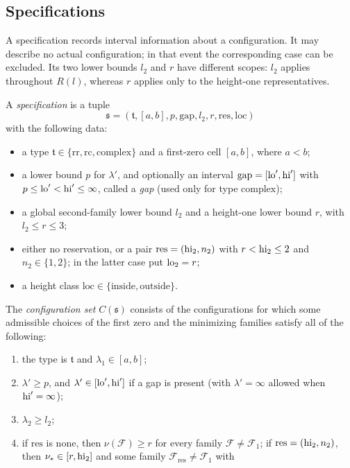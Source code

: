 \subsection{Specifications}\label{subsec:specifications}

A specification records interval information about a configuration. It may describe
no actual configuration; in that event the corresponding case can be excluded.
Its two lower bounds $l_2$ and $r$ have different scopes: $l_2$ applies throughout
$R(l)$, whereas $r$ applies only to the height-one representatives.

\begin{definition}[Specification]\label{def:specification}
A \emph{specification} is a tuple
\[
  \mathfrak s=(\mathfrak t,[a,b],p,\mathrm{gap},l_2,r,\mathrm{res},\mathrm{loc})
\]
with the following data:
\begin{itemize}
  \item a type $\mathfrak t\in\{\mathrm{rr},\mathrm{rc},\mathrm{complex}\}$ and a
    first-zero cell $[a,b]$, where $a<b$;
  \item a lower bound $p$ for $\lambda'$, and optionally an interval
    $\mathrm{gap}=[\mathrm{lo}',\mathrm{hi}']$ with $p\le\mathrm{lo}'<\mathrm{hi}'\le\infty$, called a \emph{gap}
    (used only for type $\mathrm{complex}$);
  \item a global second-family lower bound $l_2$ and a height-one lower bound $r$,
    with $l_2\le r\le3$;
  \item either no reservation, or a pair $\mathrm{res}=(\mathrm{hi}_2,n_2)$ with
    $r<\mathrm{hi}_2\le2$ and $n_2\in\{1,2\}$; in the latter case put $\mathrm{lo}_2=r$;
  \item a height class $\mathrm{loc}\in\{\mathrm{inside},\mathrm{outside}\}$.
\end{itemize}
The \emph{configuration set} $C(\mathfrak s)$ consists of the configurations for which
some admissible choices of the first zero and the minimizing families satisfy all of
the following:
\begin{enumerate}[(C1)]
  \item the type is $\mathfrak t$ and $\lambda_1\in[a,b]$;
  \item $\lambda'\ge p$, and $\lambda'\in[\mathrm{lo}',\mathrm{hi}']$ if a gap is present (with $\lambda'=\infty$ allowed
    when $\mathrm{hi}'=\infty$);
  \item $\lambda_2\ge l_2$;
  \item if $\mathrm{res}$ is none, then $\nu(\mathcal F)\ge r$ for every family $\mathcal F\ne\mathcal F_1$; if
    $\mathrm{res}=(\mathrm{hi}_2,n_2)$, then $\nu_*\in[r,\mathrm{hi}_2]$ and some family $\mathcal F_{\mathrm{res}}\ne\mathcal F_1$ with

\end{enumerate}
\end{definition}
